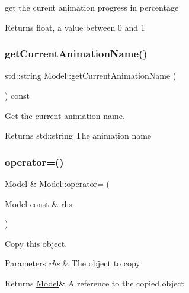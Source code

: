 get the curent animation progress in percentage 

\begin{DoxyReturn}{Returns}
float, a value between 0 and 1 
\end{DoxyReturn}
\mbox{\label{class_model_aefd911e07fa22f4b397057185b5aba1b}} 
\subsubsection{\texorpdfstring{get\+Current\+Animation\+Name()}{getCurrentAnimationName()}}
{\footnotesize\ttfamily std\+::string Model\+::get\+Current\+Animation\+Name (\begin{DoxyParamCaption}{ }\end{DoxyParamCaption}) const}



Get the current animation name. 

\begin{DoxyReturn}{Returns}
std\+::string The animation name 
\end{DoxyReturn}
\mbox{\label{class_model_a002b25b1a4724e1d67c7f93d2db721e4}} 
\subsubsection{\texorpdfstring{operator=()}{operator=()}}
{\footnotesize\ttfamily \hyperlink{class_model}{Model} \& Model\+::operator= (\begin{DoxyParamCaption}\item[{\hyperlink{class_model}{Model} const \&}]{rhs }\end{DoxyParamCaption})}



Copy this object. 


\begin{DoxyParams}{Parameters}
{\em rhs} & The object to copy \\
\hline
\end{DoxyParams}
\begin{DoxyReturn}{Returns}
\hyperlink{class_model}{Model}\& A reference to the copied object 
\end{DoxyReturn}
\mbox{\label{class_model_a7a9a9f18809ed6fb7796a16169eb4ef5}} 
